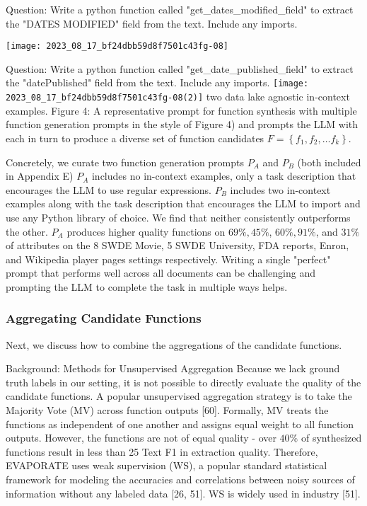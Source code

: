 \documentclass[10pt]{article}
\begin{document}
Question: Write a python function called "get\_dates\_modified\_field" to extract the "DATES MODIFIED" field from the text. Include any imports.

\begin{center}
\texttt{[image: 2023\_08\_17\_bf24dbb59d8f7501c43fg-08]}
\end{center}

Question: Write a python function called "get\_date\_published\_field" to extract the "datePublished" field from the text. Include any imports.
\texttt{[image: 2023\_08\_17\_bf24dbb59d8f7501c43fg-08(2)]}
two data lake agnostic in-context examples.
Figure 4: A representative prompt for function synthesis with multiple function generation prompts in the style of Figure 4) and prompts the LLM with each in turn to produce a diverse set of function candidates $F=\left\{f_{1}, f_{2}, \ldots f_{k}\right\}$.

Concretely, we curate two function generation prompts $P_{A}$ and $P_{B}$ (both included in Appendix E) $P_{A}$ includes no in-context examples, only a task description that encourages the LLM to use regular expressions. $P_{B}$ includes two in-context examples along with the task description that encourages the LLM to import and use any Python library of choice. We find that neither consistently outperforms the other. $P_{A}$ produces higher quality functions on $69 \%, 45 \%$, $60 \%, 91 \%$, and $31 \%$ of attributes on the 8 SWDE Movie, 5 SWDE University, FDA reports, Enron, and Wikipedia player pages settings respectively. Writing a single "perfect" prompt that performs well across all documents can be challenging and prompting the LLM to complete the task in multiple ways helps.

\subsubsection{Aggregating Candidate Functions}
Next, we discuss how to combine the aggregations of the candidate functions.

Background: Methods for Unsupervised Aggregation Because we lack ground truth labels in our setting, it is not possible to directly evaluate the quality of the candidate functions. A popular unsupervised aggregation strategy is to take the Majority Vote (MV) across function outputs [60]. Formally, MV treats the functions as independent of one another and assigns equal weight to all function outputs. However, the functions are not of equal quality - over $40 \%$ of synthesized functions result in less than 25 Text F1 in extraction quality. Therefore, EVAPORATE uses weak supervision (WS), a popular standard statistical framework for modeling the accuracies and correlations between noisy sources of information without any labeled data [26, 51]. WS is widely used in industry [51].
\end{document}
